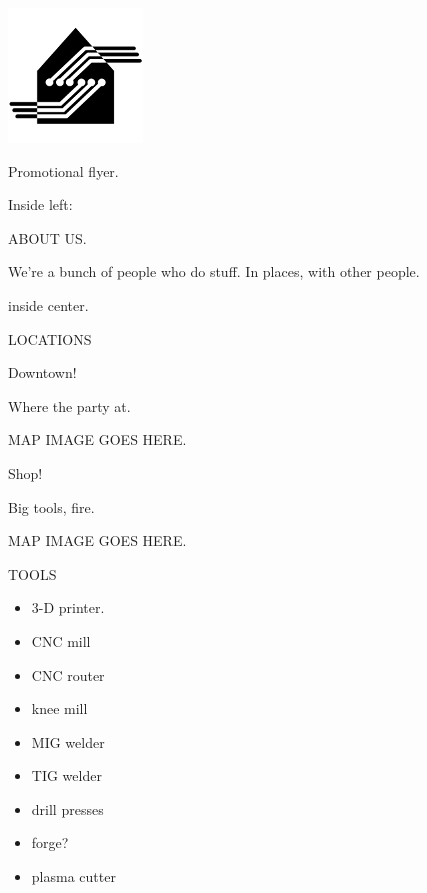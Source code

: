 \documentclass{leaflet}
\begin{document}
\begin{center} 
\includegraphics[scale=0.6]{logos/logo.png} \\
\normalsize
\end{center}

Promotional flyer.


\newpage

Inside left:

ABOUT US.

We're a bunch of people who do stuff.  In places, with other people.




\newpage

inside center.

LOCATIONS

\Large Downtown! 

\normalsize

Where the party at.


MAP IMAGE GOES HERE.



\Large Shop!

\normalsize

Big tools, fire.


MAP IMAGE GOES HERE.


\newpage


TOOLS

\begin{itemize}

\item 3-D printer.

\item CNC mill

\item CNC router

\item knee mill

\item MIG welder

\item TIG welder

\item drill presses

\item forge?

\item plasma cutter


\end{itemize}
\end{document}
